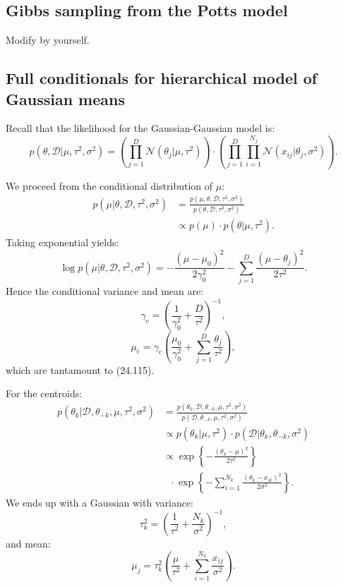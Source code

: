 \documentclass[UTF8]{ctexart}
\begin{document}
\subsection{Gibbs sampling from the Potts model}
Modify by yourself.

\subsection{Full conditionals for hierarchical model of Gaussian means}
Recall that the likelihood for the Gaussian-Gaussian model is:
$$p(\theta,\mathcal{D}|\mu,\tau^{2},\sigma^{2})=\left(\prod_{j=1}^{D}\mathcal{N}(\theta_{j}|\mu,\tau^{2}) \right)\cdot \left(\prod_{j=1}^{D}\prod_{i=1}^{N_{j}}\mathcal{N}(x_{ij}|\theta_{j},\sigma^{2}) \right).$$

We proceed from the conditional distribution of $\mu$:
$$
\begin{aligned}
p(\mu|\theta,\mathcal{D},\tau^{2},\sigma^{2})&=\frac{p(\mu,\theta,\mathcal{D},\tau^{2},\sigma^{2})}{p(\theta,\mathcal{D},\tau^{2},\sigma^{2})} \\
&\propto p(\mu)\cdot p(\theta|\mu,\tau^{2}).
\end{aligned}
$$
Taking exponential yields:
$$
\log p(\mu|\theta,\mathcal{D},\tau^{2},\sigma^{2})= -\frac{(\mu-\mu_{0})^{2}}{2\gamma^{2}_{0}}-\sum_{j=1}^{D}\frac{(\mu-\theta_{j})^{2}}{2\tau^{2}}.
$$
Hence the conditional variance and mean are:
$$\gamma_{\text{c}}=\left(\frac{1}{\gamma^{2}_{0}}+\frac{D}{\tau^{2}} \right)^{-1},$$
$$\mu_{\text{c}}=\gamma_{\text{c}}\left(\frac{\mu_{0}}{\gamma^{2}_{0}}+\sum_{j=1}^{D}\frac{\theta_{j}}{\tau^{2}} \right),$$
which are tantamount to (24.115).

For the centroids:
$$
\begin{aligned}
p(\theta_{k}|\mathcal{D},\theta_{-k},\mu,\tau^{2},\sigma^{2})&=\frac{p(\theta_{k},\mathcal{D},\theta_{-k},\mu,\tau^{2},\sigma^{2})}{p(\mathcal{D},\theta_{-k},\mu,\tau^{2},\sigma^{2})}\\
&\propto p(\theta_{k}|\mu,\tau^{2})\cdot p(\mathcal{D}|\theta_{k},\theta_{-k},\sigma^{2})\\
&\propto \exp\left\{-\frac{(\theta_{k}-\mu)^{2}}{2\tau^{2}} \right\}\\
&\ \ \ \cdot \exp\left\{-\sum_{i=1}^{N_{k}}\frac{(\theta_{k}-x_{ik})^{2}}{2\sigma^{2}} \right\}.
\end{aligned}
$$
We ends up with a Gaussian with variance:
$$\tau^{2}_{k}=\left(\frac{1}{\tau^{2}}+\frac{N_{k}}{\sigma^{2}} \right)^{-1},$$
and mean:
$$\mu_{j}=\tau^{2}_{k}\left(\frac{\mu}{\tau^{2}}+\sum_{i=1}^{N_{k}}\frac{x_{ij}}{\sigma^{2}} \right).$$
\end{document}
